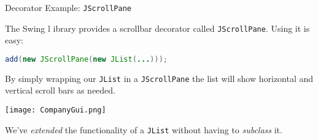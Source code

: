 \documentclass{beamer}
\begin{document}
\begin{frame}[fragile]{Decorator Example: {\tt JScrollPane}}


The Swing l ibrary provides a scrollbar decorator called {\tt JScrollPane}.  Using it is easy:
\begin{lstlisting}[language=Java]
add(new JScrollPane(new JList(...)));
\end{lstlisting}
By simply wrapping our {\tt JList} in a {\tt JScrollPane} the list will show horizontal and vertical scroll bars as needed.

\begin{center}
\texttt{[image: CompanyGui.png]}
\end{center}
\vspace{-.1in}
We've {\it extended} the functionality of a {\tt JList} without having to {\it subclass} it.

\end{frame}








\end{document}
